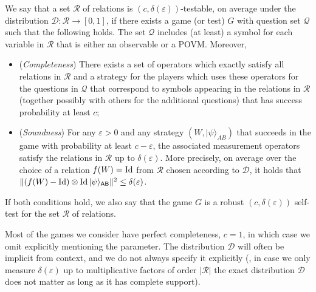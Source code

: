\documentclass{toc}
\newcommand{\ket}[1]{|#1\rangle}
\newcommand{\Id}{\ensuremath{\mathop{\rm Id}\nolimits}}
\newcommand{\reg}[1]{{\textsf{#1}}}
\newcommand{\eps}{\varepsilon}
\begin{document}
\begin{definition}
We say that a
set $\mathcal{R}$ of relations %
is $(c,\delta(\eps))$-testable, on average under the distribution $\mathcal{D}:\mathcal{R}\to[0,1]$, if
  there exists a game (or test) $G$ with question set $\mathcal{Q}$ such that the following holds. The set $\mathcal{Q}$ includes (at least) a symbol for each variable in $\mathcal{R}$ that is either
  an observable or a POVM. Moreover,
\begin{itemize}
\item (\emph{Completeness}) There exists a set of operators which exactly satisfy all relations in $\mathcal{R}$ and a strategy for the players which uses these operators for the questions in $\mathcal{Q}$ that correspond to symbols appearing in the relations
in  %
$\mathcal{R}$ (together possibly with others for the additional questions) that has success probability at least $c$;
\item (\emph{Soundness}) For any $\eps>0$ and any strategy $(W,\ket{\psi}_{AB})$ that succeeds in the game with probability at least $c-\eps$, the associated measurement operators satisfy the relations in $\mathcal{R}$ up to $\delta(\eps)$. More precisely, on average
 over the choice of a relation $f(W)=\Id$ from $\mathcal{R}$ chosen according to $\mathcal{D}$, it holds that $\|  (f(W)-\Id)\otimes\Id \ket{\psi}_{\reg{AB}}\|^2 \leq \delta(\eps)$.
\end{itemize}
If both conditions hold, we also say that the game $G$ is a robust $(c,\delta(\eps))$ self-test for the %
set $\mathcal{R}$ of relations. %
\end{definition}

Most of the games we consider have perfect completeness, $c=1$, in which case we  omit explicitly mentioning the parameter. 
 The distribution $\mathcal{D}$ will often be implicit from context, and we do not always specify it explicitly (\eg, in case we only measure $\delta(\eps)$ up to multiplicative factors of order $|\mathcal{R}|$ the exact distribution $\mathcal{D}$ does not matter as long as it has complete support). 
\end{document}
